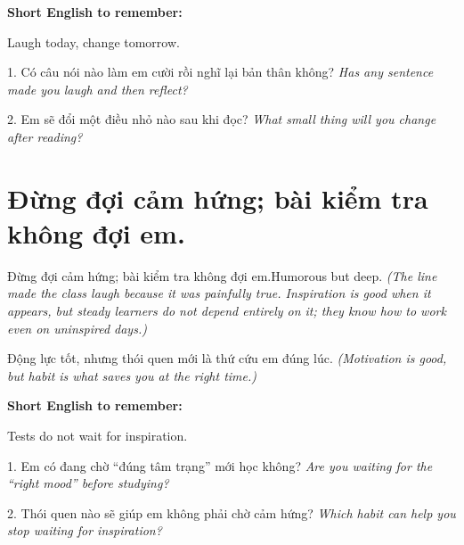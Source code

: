 \begin{ghinhoanh}
\textbf{Short English to remember:}

Laugh today, change tomorrow.

\end{ghinhoanh}

\begin{tuhocnhanh}
1. Có câu nói nào làm em cười rồi nghĩ lại bản thân không? \textit{Has any sentence made you laugh and then reflect?}

2. Em sẽ đổi một điều nhỏ nào sau khi đọc? \textit{What small thing will you change after reading?}
\end{tuhocnhanh}
\ngancach

\section{Đừng đợi cảm hứng; bài kiểm tra không đợi em.}
\begin{truyen}{Đừng đợi cảm hứng; bài kiểm tra không đợi em.}{Humorous but deep.}
\textit{(The line made the class laugh because it was painfully true. Inspiration is good when it appears, but steady learners do not depend entirely on it; they know how to work even on uninspired days.)}
\end{truyen}

\begin{baihoc}
Động lực tốt, nhưng thói quen mới là thứ cứu em đúng lúc.
\textit{(Motivation is good, but habit is what saves you at the right time.)}
\end{baihoc}

\begin{ghinhoanh}
\textbf{Short English to remember:}

Tests do not wait for inspiration.

\end{ghinhoanh}

\begin{tuhocnhanh}
1. Em có đang chờ “đúng tâm trạng” mới học không? \textit{Are you waiting for the “right mood” before studying?}

2. Thói quen nào sẽ giúp em không phải chờ cảm hứng? \textit{Which habit can help you stop waiting for inspiration?}
\end{tuhocnhanh}
\ngancach

